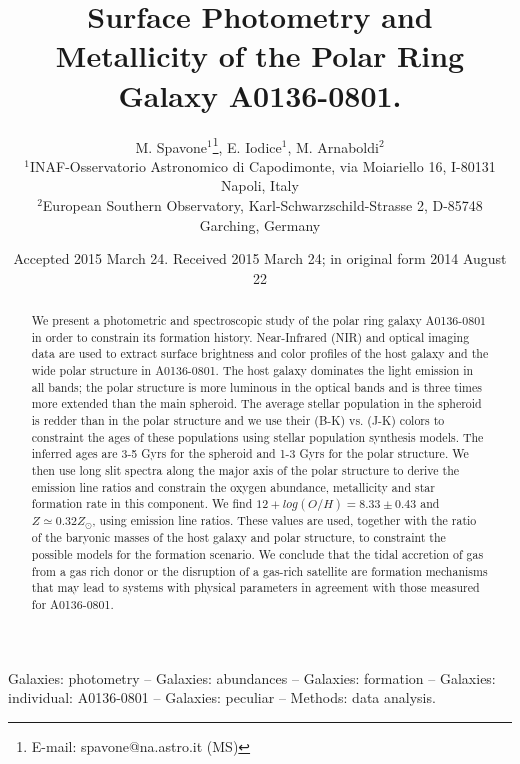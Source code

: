 \documentclass[useAMS,usenatbib]{mn2e}
\title[The Polar Ring Galaxy A0136-0801.]{Surface Photometry and Metallicity of the Polar Ring Galaxy A0136-0801.}
\author[M. Spavone et al.]{M. Spavone$^{1}$\thanks{E-mail: spavone@na.astro.it (MS)}, E. Iodice$^{1}$, M. Arnaboldi$^{2}$\\
   $^{1}$INAF-Osservatorio Astronomico di Capodimonte, via Moiariello 16, I-80131 Napoli, Italy\\
   $^{2}$European Southern Observatory, Karl-Schwarzschild-Strasse 2, D-85748 Garching, Germany}
\begin{document}

   \date{Accepted 2015 March 24.  Received 2015 March 24; in original form 2014 August 22}

\pagerange{\pageref{firstpage}--\pageref{lastpage}} 

\maketitle

\label{firstpage}

\begin{abstract}

We present a photometric and spectroscopic study of the polar
  ring galaxy A0136-0801 in order to constrain its formation
  history. Near-Infrared (NIR) and optical imaging data are used to
  extract surface brightness and color profiles of the host galaxy and
  the wide polar structure in A0136-0801. The host galaxy dominates
  the light emission in all bands; the polar structure is more
  luminous in the optical bands and is three times more extended than
  the main spheroid. The average stellar population in the spheroid is
  redder than in the polar structure and we use their (B-K) vs. (J-K)
  colors to constraint the ages of these populations using stellar
  population synthesis models. The inferred ages are 3-5 Gyrs for the
  spheroid and 1-3 Gyrs for the polar structure. We then use long slit
  spectra along the major axis of the polar structure to derive the
  emission line ratios and constrain the oxygen abundance, metallicity
  and star formation rate in this component. We find $12+log(O/H) =
  8.33 \pm 0.43$ and $Z\simeq 0.32 Z_{\odot}$, using emission
    line ratios. These values are
  used, together with the ratio of the baryonic masses of the host
  galaxy and polar structure, to constraint the possible models for
  the formation scenario. We conclude that the tidal accretion of gas
  from a gas rich donor or the disruption of a gas-rich satellite are
  formation mechanisms that may lead to systems with physical
  parameters in agreement with those measured for A0136-0801.

\end{abstract}


   \begin{keywords}
Galaxies: photometry -- Galaxies: abundances --
Galaxies: formation -- Galaxies: individual: A0136-0801 --
Galaxies: peculiar -- Methods: data analysis.
\end{keywords}
\end{document}
